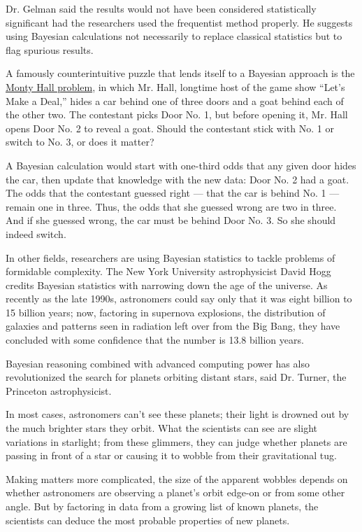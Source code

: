 Dr. Gelman said the results would not have been considered statistically
significant had the researchers used the frequentist method properly. He
suggests using Bayesian calculations not necessarily to replace
classical statistics but to flag spurious results.

A famously counterintuitive puzzle that lends itself to a Bayesian
approach is the
\href{http://www.nytimes3xbfgragh.onion/2008/04/08/science/08tier.html}{Monty
Hall problem}, in which Mr. Hall, longtime host of the game show ``Let's
Make a Deal,'' hides a car behind one of three doors and a goat behind
each of the other two. The contestant picks Door No. 1, but before
opening it, Mr. Hall opens Door No. 2 to reveal a goat. Should the
contestant stick with No. 1 or switch to No. 3, or does it matter?

A Bayesian calculation would start with one-third odds that any given
door hides the car, then update that knowledge with the new data: Door
No. 2 had a goat. The odds that the contestant guessed right --- that
the car is behind No. 1 --- remain one in three. Thus, the odds that she
guessed wrong are two in three. And if she guessed wrong, the car must
be behind Door No. 3. So she should indeed switch.

In other fields, researchers are using Bayesian statistics to tackle
problems of formidable complexity. The New York University
astrophysicist David Hogg credits Bayesian statistics with narrowing
down the age of the universe. As recently as the late 1990s, astronomers
could say only that it was eight billion to 15 billion years; now,
factoring in supernova explosions, the distribution of galaxies and
patterns seen in radiation left over from the Big Bang, they have
concluded with some confidence that the number is 13.8 billion years.

Bayesian reasoning combined with advanced computing power has also
revolutionized the search for planets orbiting distant stars, said Dr.
Turner, the Princeton astrophysicist.

In most cases, astronomers can't see these planets; their light is
drowned out by the much brighter stars they orbit. What the scientists
can see are slight variations in starlight; from these glimmers, they
can judge whether planets are passing in front of a star or causing it
to wobble from their gravitational tug.

Making matters more complicated, the size of the apparent wobbles
depends on whether astronomers are observing a planet's orbit edge-on or
from some other angle. But by factoring in data from a growing list of
known planets, the scientists can deduce the most probable properties of
new planets.

